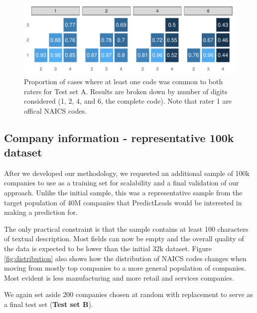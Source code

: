 \documentclass[fleqn,moreauthors,10pt]{ds_report}
\begin{document}
\begin{figure}
    \centering
    \includegraphics[width=\linewidth]{fig/interrater.pdf}
    \caption{Proportion of cases where at least one code was common to both raters for Test set A. Results are broken down by number of digits considered (1, 2, 4, and 6, the complete code). Note that rater 1 are offical NAICS codes.}
    \label{fig:interrater}
\end{figure}

\subsection*{Company information - representative 100k dataset}

After we developed our methodology, we requested an additional sample of 100k companies to use as a training set for scalability and a final validation of our approach. Unlike the initial sample, this was a representative sample from the target population of 40M companies that PredictLeads would be interested in making a prediction for.

The only practical constraint is that the sample contains at least 100 characters of textual description. Most fields can now be empty and the overall quality of the data is expected to be lower than the initial 32k dataset. Figure \ref{fig:distribution} also shows how the distribution of NAICS codes changes when moving from mostly top companies to a more general population of companies. Most evident is less manufacturing and more retail and services companies.

We again set aside 200 companies chosen at random with replacement to serve as a final test set (\textbf{Test set B}).
\end{document}
